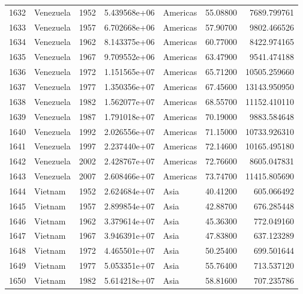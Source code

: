 \documentclass[
  letterpaper,
  DIV=11,
  numbers=noendperiod]{scrreprt}
\begin{document}
\begin{tabular}{llrrlrr}
1632 &                 Venezuela &  1952 &  5.439568e+06 &  Americas &  55.08800 &    7689.799761 \\
1633 &                 Venezuela &  1957 &  6.702668e+06 &  Americas &  57.90700 &    9802.466526 \\
1634 &                 Venezuela &  1962 &  8.143375e+06 &  Americas &  60.77000 &    8422.974165 \\
1635 &                 Venezuela &  1967 &  9.709552e+06 &  Americas &  63.47900 &    9541.474188 \\
1636 &                 Venezuela &  1972 &  1.151565e+07 &  Americas &  65.71200 &   10505.259660 \\
1637 &                 Venezuela &  1977 &  1.350356e+07 &  Americas &  67.45600 &   13143.950950 \\
1638 &                 Venezuela &  1982 &  1.562077e+07 &  Americas &  68.55700 &   11152.410110 \\
1639 &                 Venezuela &  1987 &  1.791018e+07 &  Americas &  70.19000 &    9883.584648 \\
1640 &                 Venezuela &  1992 &  2.026556e+07 &  Americas &  71.15000 &   10733.926310 \\
1641 &                 Venezuela &  1997 &  2.237440e+07 &  Americas &  72.14600 &   10165.495180 \\
1642 &                 Venezuela &  2002 &  2.428767e+07 &  Americas &  72.76600 &    8605.047831 \\
1643 &                 Venezuela &  2007 &  2.608466e+07 &  Americas &  73.74700 &   11415.805690 \\
1644 &                   Vietnam &  1952 &  2.624684e+07 &      Asia &  40.41200 &     605.066492 \\
1645 &                   Vietnam &  1957 &  2.899854e+07 &      Asia &  42.88700 &     676.285448 \\
1646 &                   Vietnam &  1962 &  3.379614e+07 &      Asia &  45.36300 &     772.049160 \\
1647 &                   Vietnam &  1967 &  3.946391e+07 &      Asia &  47.83800 &     637.123289 \\
1648 &                   Vietnam &  1972 &  4.465501e+07 &      Asia &  50.25400 &     699.501644 \\
1649 &                   Vietnam &  1977 &  5.053351e+07 &      Asia &  55.76400 &     713.537120 \\
1650 &                   Vietnam &  1982 &  5.614218e+07 &      Asia &  58.81600 &     707.235786 \\

\end{tabular}
\end{document}
